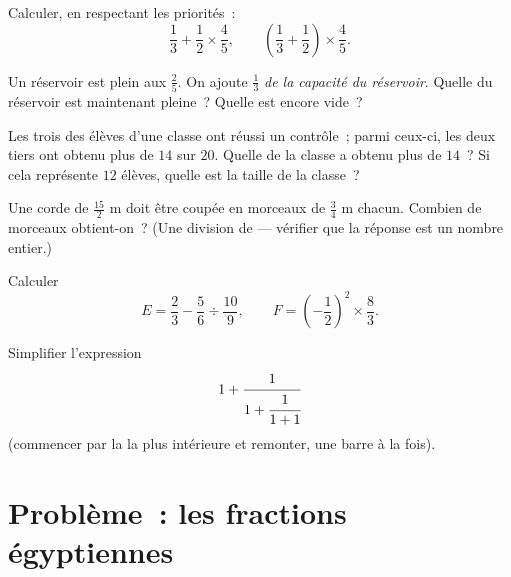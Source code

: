 \begin{exercise}[$\star$]\label{exo:g8:fractions:7}
Calculer, en respectant les priorités~:
\[
\frac{1}{3} + \frac{1}{2} \times \frac{4}{5},
\qquad
\left(\frac{1}{3} + \frac{1}{2}\right) \times \frac{4}{5} .
\]
\end{exercise}

\begin{exercise}[$\star\star$]\label{exo:g8:fractions:8}
Un réservoir est plein aux $\frac{2}{5}$. On ajoute $\frac{1}{3}$
\emph{de la capacité du réservoir}. Quelle  du réservoir est
maintenant pleine~? Quelle  est encore vide~?
\end{exercise}

\begin{exercise}[$\star\star$]\label{exo:g8:fractions:9}
Les trois  des élèves d'une classe ont réussi un contrôle~;
parmi ceux-ci, les deux tiers ont obtenu plus de $14$ sur $20$.
Quelle  de la classe a obtenu plus de $14$~? Si cela
représente $12$ élèves, quelle est la taille de la classe~?
\end{exercise}

\begin{exercise}[$\star\star$]\label{exo:g8:fractions:10}
Une corde de $\frac{15}{2}$ m doit être coupée en morceaux de
$\frac{3}{4}$ m chacun. Combien de morceaux obtient-on~? (Une
division de  --- vérifier que la réponse est un nombre
entier.)
\end{exercise}

\begin{exercise}[$\star\star$]\label{exo:g8:fractions:11}
Calculer
\[
E = \frac{2}{3} - \frac{5}{6} \div \frac{10}{9},
\qquad
F = \left(-\frac{1}{2}\right)^2 \times \frac{8}{3} .
\]
\end{exercise}

\begin{exercise}[$\star\star\star$]\label{exo:g8:fractions:12}
Simplifier l'expression
\[
1 + \cfrac{1}{1 + \cfrac{1}{1 + 1}}
\]
(commencer par la  la plus intérieure et remonter, une barre
à la fois).
\end{exercise}

\section{Problème~: les fractions égyptiennes}

